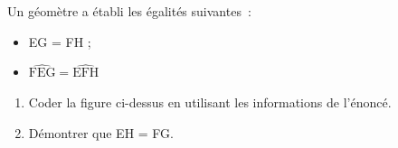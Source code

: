\documentclass[exercice]{thedocument}%
\begin{document}
%
Un géomètre a établi les égalités suivantes~:
\begin{itemize}
    \item EG = FH ;
    \item $\widehat{\text{FEG}}=\widehat{\text{EFH}}$
\end{itemize}\noindent
{\centering{}\par}
\begin{enumerate}
    \item Coder la figure ci-dessus en utilisant les informations de l'énoncé.
    \item Démontrer que EH = FG.
\end{enumerate}
\end{document}
